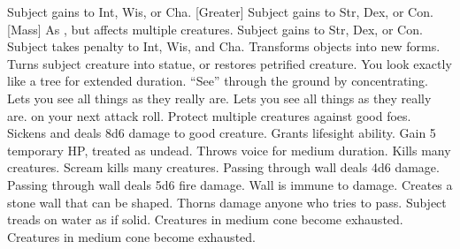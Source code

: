     {Subject gains  to Int, Wis, or Cha.}
[Greater]
    {Subject gains  to Str, Dex, or Con.}
[Mass]
    {As , but affects multiple creatures.}
    {Subject gains  to Str, Dex, or Con.}
    {Subject takes  penalty to Int, Wis, and Cha.}
    {Transforms objects into new forms.}
    {Turns subject creature into statue, or restores petrified creature.}
    {You look exactly like a tree for extended duration.}
    {``See'' through the ground by concentrating.}
    {Lets you see all things as they really are.}
    {\M Lets you see all things as they really are.}
    { on your next attack roll.}
    {Protect multiple creatures against good foes. }
    {Sickens and deals 8d6 damage to good creature.}
    {Grants lifesight ability.}
    {Gain 5 temporary HP, treated as undead.}
    {Throws voice for medium duration.}
    {Kills many creatures.}
    {Scream kills many creatures. }
    {Passing through wall deals 4d6 damage.}
    {Passing through wall deals 5d6 fire damage.}
    {Wall is immune to damage.}
    {Creates a stone wall that can be shaped.}
    {Thorns damage anyone who tries to pass.}
    {Subject treads on water as if solid.}
    {Creatures in medium cone become exhausted.  }
    {Creatures in medium cone become exhausted.}
